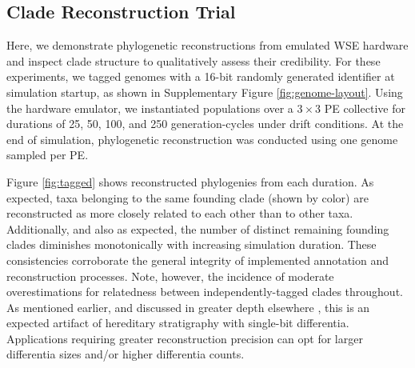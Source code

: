 \subsection{Clade Reconstruction Trial}


Here, we demonstrate phylogenetic reconstructions from emulated WSE hardware and inspect clade structure to qualitatively assess their credibility.
For these experiments, we tagged genomes with a 16-bit randomly generated identifier at simulation startup, as shown in Supplementary Figure \ref{fig:genome-layout}.
Using the hardware emulator, we instantiated populations over a $3\times3$ PE collective for durations of 25, 50, 100, and 250 generation-cycles under drift conditions.
At the end of simulation, phylogenetic reconstruction was conducted using one genome sampled per PE.



Figure \ref{fig:tagged} shows reconstructed phylogenies from each duration.
As expected, taxa belonging to the same founding clade (shown by color) are reconstructed as more closely related to each other than to other taxa.
Additionally, and also as expected, the number of distinct remaining founding clades diminishes monotonically with increasing simulation duration.
These consistencies corroborate the general integrity of implemented annotation and reconstruction processes.
Note, however, the incidence of moderate overestimations for relatedness between independently-tagged clades throughout.
As mentioned earlier, and discussed in greater depth elsewhere \citep{moreno2024guide}, this is an expected artifact of hereditary stratigraphy with single-bit differentia.
Applications requiring greater reconstruction precision can opt for larger differentia sizes and/or higher differentia counts.


